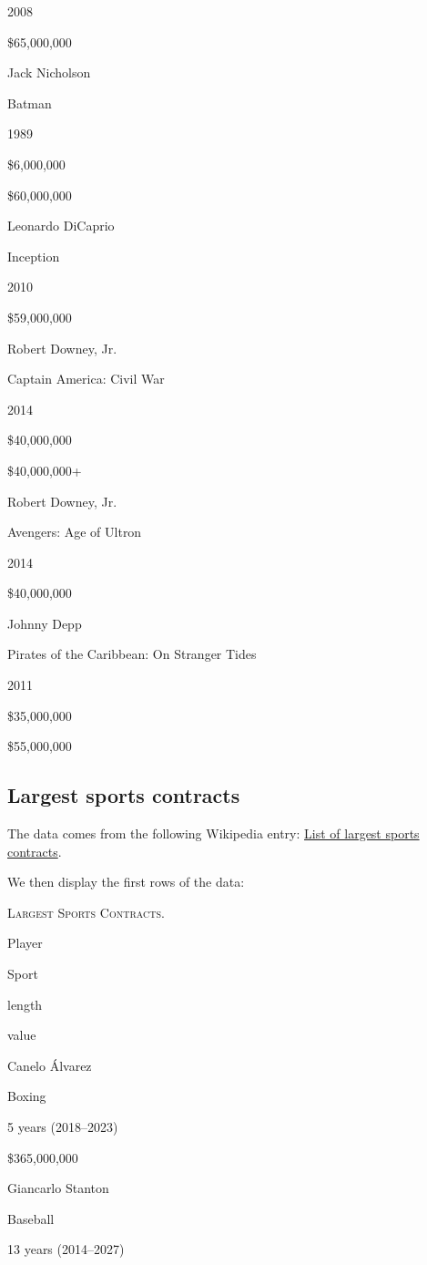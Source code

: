 \documentclass[]{book}
\theoremstyle{definition}
\theoremstyle{definition}
\theoremstyle{definition}
\theoremstyle{remark}
\begin{document}
2008

\$65,000,000

Jack Nicholson

Batman

1989

\$6,000,000

\$60,000,000

Leonardo DiCaprio

Inception

2010

\$59,000,000

Robert Downey, Jr.

Captain America: Civil War

2014

\$40,000,000

\$40,000,000+

Robert Downey, Jr.

Avengers: Age of Ultron

2014

\$40,000,000

Johnny Depp

Pirates of the Caribbean: On Stranger Tides

2011

\$35,000,000

\$55,000,000

\subsection{Largest sports contracts}\label{largest-sports-contracts}

The data comes from the following Wikipedia entry:
\href{https://en.wikipedia.org/wiki/List_of_largest_sports_contracts}{List
of largest sports contracts}.



We then display the first rows of the data:

\label{tab:unnamed-chunk-13}\textsc{Largest Sports Contracts.}

Player

Sport

length

value

Canelo Álvarez

Boxing

5 years (2018--2023)

\$365,000,000

Giancarlo Stanton

Baseball

13 years (2014--2027)
\end{document}
